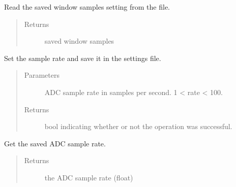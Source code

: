 \documentclass[letterpaper,10pt,english]{sphinxmanual}
\begin{document}
\begin{fulllineitems}
\label{\detokenize{settings_interface:settings_interface.get_window_samples}}
Read the saved window samples setting from the file.
\begin{quote}\begin{description}
\item[{Returns}] \leavevmode
saved window samples

\end{description}\end{quote}

\end{fulllineitems}


\begin{fulllineitems}
\label{\detokenize{settings_interface:settings_interface.set_sample_rate}}
Set the sample rate and save it in the settings file.
\begin{quote}\begin{description}
\item[{Parameters}] \leavevmode
{} \textendash{} ADC sample rate in samples per second. 1 \textless{} rate \textless{} 100.

\item[{Returns}] \leavevmode
bool indicating whether or not the operation was successful.

\end{description}\end{quote}

\end{fulllineitems}


\begin{fulllineitems}
\label{\detokenize{settings_interface:settings_interface.get_sample_rate}}
Get the saved ADC sample rate.
\begin{quote}\begin{description}
\item[{Returns}] \leavevmode
the ADC sample rate (float)

\end{description}\end{quote}

\end{fulllineitems}
\end{document}
